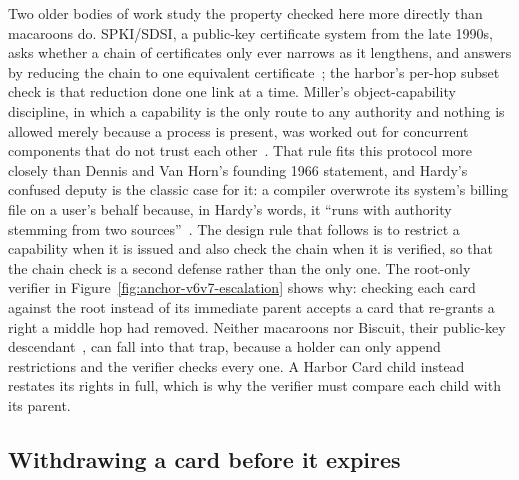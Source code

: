 \documentclass[11pt,a4paper]{article}
\theoremstyle{definition}
\begin{document}
Two older bodies of work study the property checked here more directly than macaroons do. SPKI/SDSI, a public-key certificate system from the late 1990s, asks whether a chain of certificates only ever narrows as it lengthens, and answers by reducing the chain to one equivalent certificate~; the harbor's per-hop subset check is that reduction done one link at a time. Miller's object-capability discipline, in which a capability is the only route to any authority and nothing is allowed merely because a process is present, was worked out for concurrent components that do not trust each other~. That rule fits this protocol more closely than Dennis and Van Horn's founding 1966 statement, and Hardy's confused deputy is the classic case for it: a compiler overwrote its system's billing file on a user's behalf because, in Hardy's words, it ``runs with authority stemming from two sources''~. The design rule that follows is to restrict a capability when it is issued and also check the chain when it is verified, so that the chain check is a second defense rather than the only one. The root-only verifier in Figure~\ref{fig:anchor-v6v7-escalation} shows why: checking each card against the root instead of its immediate parent accepts a card that re-grants a right a middle hop had removed. Neither macaroons nor Biscuit, their public-key descendant~, can fall into that trap, because a holder can only append restrictions and the verifier checks every one. A Harbor Card child instead restates its rights in full, which is why the verifier must compare each child with its parent.


\FloatBarrier



\subsection{Withdrawing a card before it expires}\label{sec:revocation}
\end{document}
